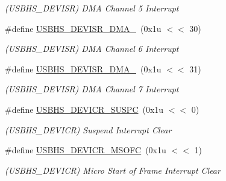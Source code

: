 \begin{DoxyCompactItemize}
\begin{DoxyCompactList}\small\item\em (U\+S\+B\+H\+S\+\_\+\+D\+E\+V\+I\+SR) D\+MA Channel 5 Interrupt \end{DoxyCompactList}\item 
\mbox{\label{group__SAMS70__USBHS_ga27613764636a9e15d4140ad5bf440774}} 
\#define \mbox{\hyperlink{group__SAMS70__USBHS_ga27613764636a9e15d4140ad5bf440774}{U\+S\+B\+H\+S\+\_\+\+D\+E\+V\+I\+S\+R\+\_\+\+D\+M\+A\+\_}}~(0x1u $<$$<$ 30)
\begin{DoxyCompactList}\small\item\em (U\+S\+B\+H\+S\+\_\+\+D\+E\+V\+I\+SR) D\+MA Channel 6 Interrupt \end{DoxyCompactList}\item 
\mbox{\label{group__SAMS70__USBHS_ga6e90562dc53a50c599f9d12f10fb3563}} 
\#define \mbox{\hyperlink{group__SAMS70__USBHS_ga6e90562dc53a50c599f9d12f10fb3563}{U\+S\+B\+H\+S\+\_\+\+D\+E\+V\+I\+S\+R\+\_\+\+D\+M\+A\+\_}}~(0x1u $<$$<$ 31)
\begin{DoxyCompactList}\small\item\em (U\+S\+B\+H\+S\+\_\+\+D\+E\+V\+I\+SR) D\+MA Channel 7 Interrupt \end{DoxyCompactList}\item 
\mbox{\label{group__SAMS70__USBHS_ga9e2ea299b3e4a3f7ec15edbd5def56d9}} 
\#define \mbox{\hyperlink{group__SAMS70__USBHS_ga9e2ea299b3e4a3f7ec15edbd5def56d9}{U\+S\+B\+H\+S\+\_\+\+D\+E\+V\+I\+C\+R\+\_\+\+S\+U\+S\+PC}}~(0x1u $<$$<$ 0)
\begin{DoxyCompactList}\small\item\em (U\+S\+B\+H\+S\+\_\+\+D\+E\+V\+I\+CR) Suspend Interrupt Clear \end{DoxyCompactList}\item 
\mbox{\label{group__SAMS70__USBHS_ga2486ae0dbcb8cd35efc0aa238a766d4f}} 
\#define \mbox{\hyperlink{group__SAMS70__USBHS_ga2486ae0dbcb8cd35efc0aa238a766d4f}{U\+S\+B\+H\+S\+\_\+\+D\+E\+V\+I\+C\+R\+\_\+\+M\+S\+O\+FC}}~(0x1u $<$$<$ 1)
\begin{DoxyCompactList}\small\item\em (U\+S\+B\+H\+S\+\_\+\+D\+E\+V\+I\+CR) Micro Start of Frame Interrupt Clear \end{DoxyCompactList}\item 

\end{DoxyCompactItemize}
